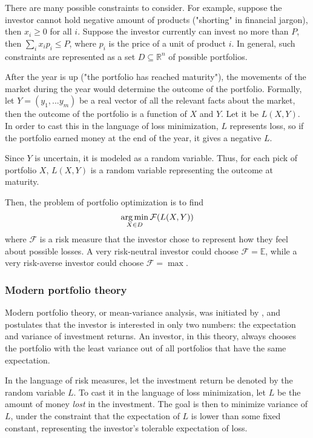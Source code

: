 There are many possible constraints to consider. For example, suppose the investor cannot hold negative amount of products ("shorting" in financial jargon), then $x_i \ge 0$ for all $i$. Suppose the investor currently can invest no more than $P$, then $\sum_i x_i p_i \le P$, where $p_i$ is the price of a unit of product $i$. In general, such constraints are represented as a set $D\subseteq \mathbb{R}^n$ of possible portfolios.

After the year is up ("the portfolio has reached maturity"), the movements of the market during the year would determine the outcome of the portfolio. Formally, let $Y = (y_1, ... y_m)$ be a real vector of all the relevant facts about the market, then the outcome of the portfolio is a function of $X$ and $Y$. Let it be $L(X, Y)$. In order to cast this in the language of loss minimization, $L$ represents loss, so if the portfolio earned money at the end of the year, it gives a negative $L$. 

Since $Y$ is uncertain, it is modeled as a random variable. Thus, for each pick of portfolio $X$, $L(X, Y)$ is a random variable representing the outcome at maturity. 

Then, the problem of portfolio optimization is to find 
\begin{equation}
\operatorname*{arg\,min}_{X\in D}\mathcal{F}(L(X, Y))
\end{equation}
where $\mathcal{F}$ is a risk measure that the investor chose to represent how they feel about possible losses. A very risk-neutral investor could choose $\mathcal{F} = \mathbb{E}$, while a very risk-averse investor could choose $\mathcal{F} = \max$.

\subsubsection{Modern portfolio theory}
Modern portfolio theory, or mean-variance analysis, was initiated by \cite{markowitzPortfolioSelection1952}, and postulates that the investor is interested in only two numbers: the expectation and variance of investment returns. An investor, in this theory, always chooses the portfolio with the least variance out of all portfolios that have the same expectation.

In the language of risk measures, let the investment return be denoted by the random variable $L$. To cast it in the language of loss minimization, let $L$ be the amount of money \textit{lost} in the investment. The goal is then to minimize variance of $L$, under the constraint that the expectation of $L$ is lower than some fixed constant, representing the investor's tolerable expectation of loss.

